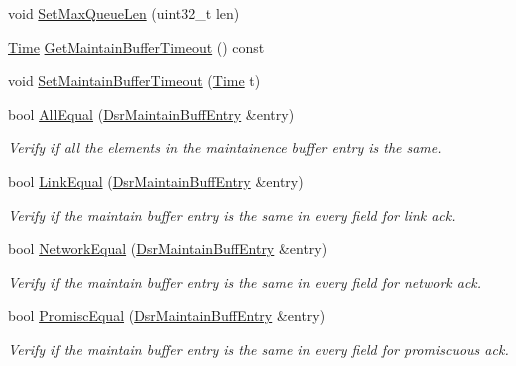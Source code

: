 \begin{DoxyCompactItemize}
\item 
void \hyperlink{classns3_1_1dsr_1_1DsrMaintainBuffer_a1e52f7157e94aea3e44003e9da22e7ff}{Set\+Max\+Queue\+Len} (uint32\+\_\+t len)
\item 
\hyperlink{classns3_1_1Time}{Time} \hyperlink{classns3_1_1dsr_1_1DsrMaintainBuffer_a0b63c01fa386ed899deab52c28e67e8e}{Get\+Maintain\+Buffer\+Timeout} () const 
\item 
void \hyperlink{classns3_1_1dsr_1_1DsrMaintainBuffer_a480bdf66ecdb34f06413d76dcacd77e9}{Set\+Maintain\+Buffer\+Timeout} (\hyperlink{classns3_1_1Time}{Time} t)
\item 
bool \hyperlink{classns3_1_1dsr_1_1DsrMaintainBuffer_a2f553fb512d4aee9a538c799bc2d0f45}{All\+Equal} (\hyperlink{classns3_1_1dsr_1_1DsrMaintainBuffEntry}{Dsr\+Maintain\+Buff\+Entry} \&entry)
\begin{DoxyCompactList}\small\item\em Verify if all the elements in the maintainence buffer entry is the same. \end{DoxyCompactList}\item 
bool \hyperlink{classns3_1_1dsr_1_1DsrMaintainBuffer_a35cc9dcd004a3a860f03d61ffe9478ef}{Link\+Equal} (\hyperlink{classns3_1_1dsr_1_1DsrMaintainBuffEntry}{Dsr\+Maintain\+Buff\+Entry} \&entry)
\begin{DoxyCompactList}\small\item\em Verify if the maintain buffer entry is the same in every field for link ack. \end{DoxyCompactList}\item 
bool \hyperlink{classns3_1_1dsr_1_1DsrMaintainBuffer_a8eaf2b7c9d9bd778db1b25b6f8d19255}{Network\+Equal} (\hyperlink{classns3_1_1dsr_1_1DsrMaintainBuffEntry}{Dsr\+Maintain\+Buff\+Entry} \&entry)
\begin{DoxyCompactList}\small\item\em Verify if the maintain buffer entry is the same in every field for network ack. \end{DoxyCompactList}\item 
bool \hyperlink{classns3_1_1dsr_1_1DsrMaintainBuffer_a8968cfdf465293896b00fe4c11c4ba72}{Promisc\+Equal} (\hyperlink{classns3_1_1dsr_1_1DsrMaintainBuffEntry}{Dsr\+Maintain\+Buff\+Entry} \&entry)
\begin{DoxyCompactList}\small\item\em Verify if the maintain buffer entry is the same in every field for promiscuous ack. \end{DoxyCompactList}\end{DoxyCompactItemize}
